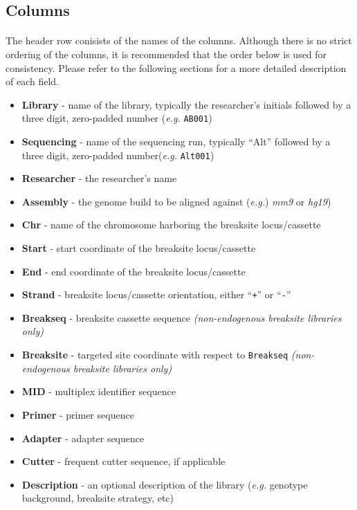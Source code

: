 \documentclass{article}
\begin{document}
\subsection*{Columns}
\paragraph{} The header row conisists of the names of the columns. Although there is no strict ordering of the columns, it is recommended that the order below is used for consistency. Please refer to the following sections for a more detailed description of each field.
\begin{itemize}
  \item \textbf{Library} - name of the library, typically the researcher's initials followed by a three digit, zero-padded number (\emph{e.g.} \texttt{AB001})
  \item \textbf{Sequencing} - name of the sequencing run, typically ``Alt'' followed by a three digit, zero-padded number(\emph{e.g.} \texttt{Alt001})
  \item \textbf{Researcher} - the researcher's name
  \item \textbf{Assembly} - the genome build to be aligned against (\emph{e.g.}) \emph{mm9} or \emph{hg19})
  \item \textbf{Chr} - name of the chromosome harboring the breaksite locus/cassette
  \item \textbf{Start} - start coordinate of the breaksite locus/cassette
  \item \textbf{End} - end coordinate of the breaksite locus/cassette
  \item \textbf{Strand} - breaksite locus/cassette orientation, either ``\texttt{+}'' or ``\texttt{-}''
  \item \textbf{Breakseq} - breaksite cassette sequence \emph{(non-endogenous breaksite libraries only)}
  \item \textbf{Breaksite} - targeted site coordinate with respect to \texttt{Breakseq}  \emph{(non-endogenous breaksite libraries only)}
  \item \textbf{MID} - multiplex identifier sequence
  \item \textbf{Primer} - primer sequence
  \item \textbf{Adapter} - adapter sequence
  \item \textbf{Cutter} - frequent cutter sequence, if applicable
  \item \textbf{Description} - an optional description of the library (\emph{e.g.} genotype background, breaksite strategy, etc)
\end{itemize}
\end{document}
